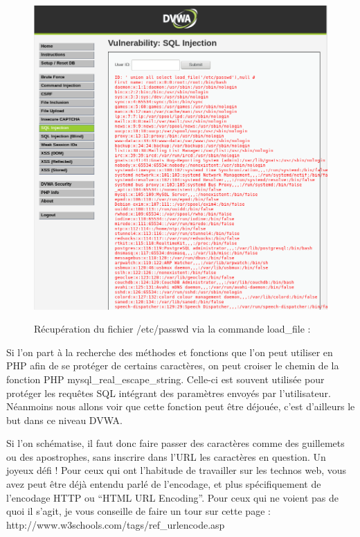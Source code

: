 \begin{figure}[!h]
	\begin{center}
		\label{}
		\includegraphics[scale=\scaledvwa]{images/sql/sqli_low2.png}
		\caption{Récupération du fichier /etc/passwd via la commande load\_file : }
	\end{center}
\end{figure}






Si l’on part à la recherche des méthodes et fonctions que l’on peut utiliser en PHP afin de se protéger de certains caractères, on peut croiser le chemin de la fonction PHP mysql\_real\_escape\_string. Celle-ci est souvent utilisée pour protéger les requêtes SQL intégrant des paramètres envoyés par l’utilisateur. Néanmoins nous allons voir que cette fonction peut être déjouée, c’est d’ailleurs le but dans ce niveau DVWA.

Si l’on schématise, il faut donc faire passer des caractères comme des guillemets ou des apostrophes, sans inscrire dans l’URL les caractères en question. Un joyeux défi ! Pour ceux qui ont l’habitude de travailler sur les technos web, vous avez peut être déjà entendu parlé de l’encodage, et plus spécifiquement de l’encodage HTTP ou “HTML URL Encoding”. Pour ceux qui ne voient pas de quoi il s’agit, je vous conseille de faire un tour sur cette page : http://www.w3schools.com/tags/ref\_urlencode.asp

